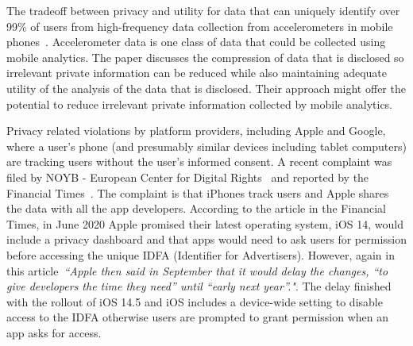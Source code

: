
The tradeoff between privacy and utility for data that can uniquely identify over 99\% of users from high-frequency data collection from accelerometers in mobile phones~\citep{menasria2018_purpose_driven_privacy_preservation_accelerometers}. Accelerometer data is one class of data that could be collected using mobile analytics. The paper discusses the compression of data that is disclosed so irrelevant private information can be reduced while also maintaining adequate utility of the analysis of the data that is disclosed. Their approach might offer the potential to reduce irrelevant private information collected by mobile analytics. %

Privacy related violations by platform providers, including Apple and Google, where a user's phone (and presumably similar devices including tablet computers) are tracking users without the user's informed consent. A recent complaint was filed by NOYB - European Center for Digital Rights~\citep{noyb2020_noyb_files_complaint_against_apples_tracking_code_idfa} and reported by the Financial Times~\citep{ft2020_apple_tracks_iphone_users_without_consent}. The complaint is that iPhones track users and Apple shares the data with all the app developers. According to the article in the Financial Times, in June 2020 Apple promised their latest operating system, iOS 14, would include a privacy dashboard and that apps would need to ask users for permission before accessing the unique IDFA (Identifier for Advertisers). However, again in this article~\emph{``Apple then said in September that it would delay the changes, “to give developers the time they need” until “early next year”."}. The delay finished with the rollout of iOS 14.5 and iOS includes a device-wide setting to disable access to the IDFA otherwise users are prompted to grant permission when an app asks for access. %



